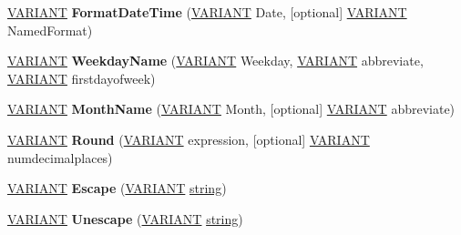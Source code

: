 \begin{DoxyCompactItemize}
\hyperlink{structtag_v_a_r_i_a_n_t}{V\+A\+R\+I\+A\+NT} {\bfseries Format\+Date\+Time} (\hyperlink{structtag_v_a_r_i_a_n_t}{V\+A\+R\+I\+A\+NT} Date, \mbox{[}optional\mbox{]} \hyperlink{structtag_v_a_r_i_a_n_t}{V\+A\+R\+I\+A\+NT} Named\+Format)
\item 
\mbox{\label{interface_v_b_script___global_1_1_global_obj_a5ea44f55c3f047cf10f13b747466a71c}} 
\hyperlink{structtag_v_a_r_i_a_n_t}{V\+A\+R\+I\+A\+NT} {\bfseries Weekday\+Name} (\hyperlink{structtag_v_a_r_i_a_n_t}{V\+A\+R\+I\+A\+NT} Weekday, \hyperlink{structtag_v_a_r_i_a_n_t}{V\+A\+R\+I\+A\+NT} abbreviate, \hyperlink{structtag_v_a_r_i_a_n_t}{V\+A\+R\+I\+A\+NT} firstdayofweek)
\item 
\mbox{\label{interface_v_b_script___global_1_1_global_obj_af17072cf82f118f3af0314dccd3f6723}} 
\hyperlink{structtag_v_a_r_i_a_n_t}{V\+A\+R\+I\+A\+NT} {\bfseries Month\+Name} (\hyperlink{structtag_v_a_r_i_a_n_t}{V\+A\+R\+I\+A\+NT} Month, \mbox{[}optional\mbox{]} \hyperlink{structtag_v_a_r_i_a_n_t}{V\+A\+R\+I\+A\+NT} abbreviate)
\item 
\mbox{\label{interface_v_b_script___global_1_1_global_obj_a6cc450389388a3814a29d4a6947386d3}} 
\hyperlink{structtag_v_a_r_i_a_n_t}{V\+A\+R\+I\+A\+NT} {\bfseries Round} (\hyperlink{structtag_v_a_r_i_a_n_t}{V\+A\+R\+I\+A\+NT} expression, \mbox{[}optional\mbox{]} \hyperlink{structtag_v_a_r_i_a_n_t}{V\+A\+R\+I\+A\+NT} numdecimalplaces)
\item 
\mbox{\label{interface_v_b_script___global_1_1_global_obj_a0b9190cbd827e233c29d951dc3f3a9ef}} 
\hyperlink{structtag_v_a_r_i_a_n_t}{V\+A\+R\+I\+A\+NT} {\bfseries Escape} (\hyperlink{structtag_v_a_r_i_a_n_t}{V\+A\+R\+I\+A\+NT} \hyperlink{structstring}{string})
\item 
\mbox{\label{interface_v_b_script___global_1_1_global_obj_aba48a1abca1e36e83ec73e183de22507}} 
\hyperlink{structtag_v_a_r_i_a_n_t}{V\+A\+R\+I\+A\+NT} {\bfseries Unescape} (\hyperlink{structtag_v_a_r_i_a_n_t}{V\+A\+R\+I\+A\+NT} \hyperlink{structstring}{string})
\item 
\mbox{\label{interface_v_b_script___global_1_1_global_obj_a46837ebebdf611fbb260eec00d2d74a4}} 

\end{DoxyCompactItemize}

